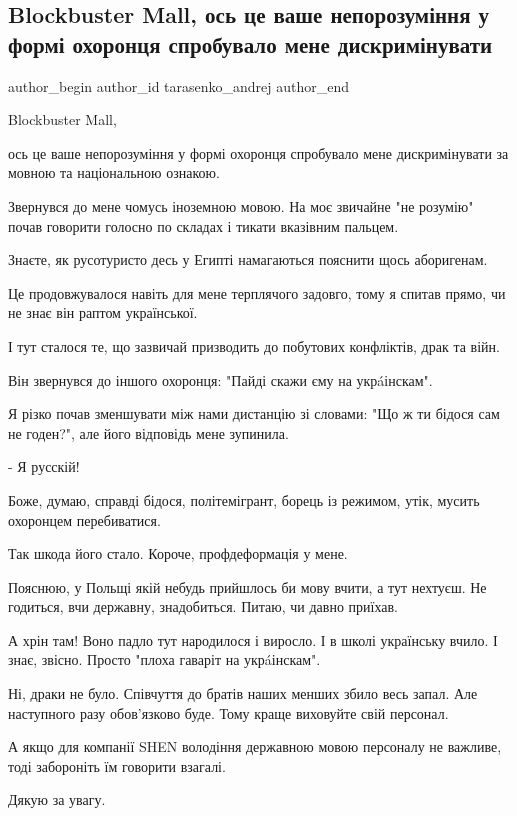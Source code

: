  
 
 
 
 
 
\subsection{Blockbuster Mall, ось це ваше непорозуміння у формі охоронця спробувало мене дискримінувати}
\label{sec:31_07_2021.fb.tarasenko_andrej.1.diskriminacia_blockbuster_mall}
 
\ifcmt
 author_begin
   author_id tarasenko_andrej
 author_end
\fi

Blockbuster Mall, 

ось це ваше непорозуміння у формі охоронця спробувало мене дискримінувати за
мовною та національною ознакою. 

Звернувся до мене чомусь іноземною мовою. На моє звичайне "не розумію" почав
говорити голосно по складах і тикати вказівним пальцем. 

Знаєте, як русотуристо десь у Египті намагаються пояснити щось аборигенам. 


Це продовжувалося навіть для мене терплячого задовго, тому я спитав прямо, чи
не знає він раптом української. 

І тут сталося те, що зазвичай призводить до побутових конфліктів, драк та війн. 

Він звернувся до іншого охоронця: "Пайді скажи єму на укрáінскам".

Я різко почав зменшувати між нами дистанцію зі словами: "Що ж ти бідося сам не
годен?", але його відповідь мене зупинила. 

- Я русскій!

Боже, думаю, справді бідося, політемігрант, борець із режимом, утік, мусить
охоронцем перебиватися. 

Так шкода його стало. Короче, профдеформація у мене. 

Пояснюю, у Польщі якій небудь прийшлось би мову вчити, а тут нехтуєш. Не
годиться, вчи державну, знадобиться. Питаю, чи давно приїхав. 

А хрін там! Воно падло тут народилося і виросло. І в школі українську вчило. І
знає, звісно. Просто "плоха гаваріт на укрáінскам".

Ні, драки не було. Співчуття до братів наших менших збило весь запал. Але
наступного разу обов’язково буде. Тому краще виховуйте свій персонал. 

А якщо для компанії SHEN володіння державною мовою персоналу не важливе, тоді
забороніть їм говорити взагалі. 

Дякую за увагу.

